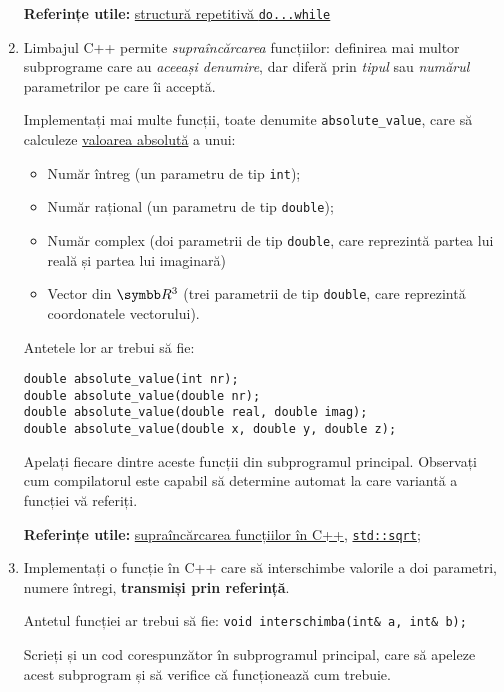 \begin{enumerate}
    \textbf{Referințe utile:} \href{https://www.tutorialspoint.com/cplusplus/cpp_do_while_loop.htm}{structură repetitivă \texttt{do...while}}

    \item Limbajul C++ permite \emph{supraîncărcarea} funcțiilor: definirea mai multor subprograme care au \emph{aceeași denumire}, dar diferă prin \emph{tipul} sau \emph{numărul} parametrilor pe care îi acceptă.

    Implementați mai multe funcții, toate denumite \texttt{absolute\_value}, care să calculeze \href{https://en.wikipedia.org/wiki/Absolute_value}{valoarea absolută} a unui:
    \begin{itemize}
        \item Număr întreg (un parametru de tip \texttt{int});
        \item Număr rațional (un parametru de tip \texttt{double});
        \item Număr complex (doi parametrii de tip \texttt{double}, care reprezintă partea lui reală și partea lui imaginară)
        \item Vector din \(\reals^3\) (trei parametrii de tip \texttt{double}, care reprezintă coordonatele vectorului).
    \end{itemize}
    
    Antetele lor ar trebui să fie:
    \begin{lstlisting}
double absolute_value(int nr);
double absolute_value(double nr);
double absolute_value(double real, double imag);
double absolute_value(double x, double y, double z);
    \end{lstlisting}

    Apelați fiecare dintre aceste funcții din subprogramul principal. Observați cum compilatorul este capabil să determine automat la care variantă a funcției vă referiți.

    \textbf{Referințe utile:} \href{https://www.geeksforgeeks.org/function-overloading-c/}{supraîncărcarea funcțiilor în C++}, \href{https://en.cppreference.com/w/cpp/numeric/math/sqrt}{\texttt{std::sqrt}};

    \item Implementați o funcție în C++ care să interschimbe valorile a doi parametri, numere întregi, \textbf{transmiși prin referință}.

    Antetul funcției ar trebui să fie: \texttt{void interschimba(int\& a, int\& b);}

    Scrieți și un cod corespunzător în subprogramul principal, care să apeleze acest subprogram și să verifice că funcționează cum trebuie.


\end{enumerate}
